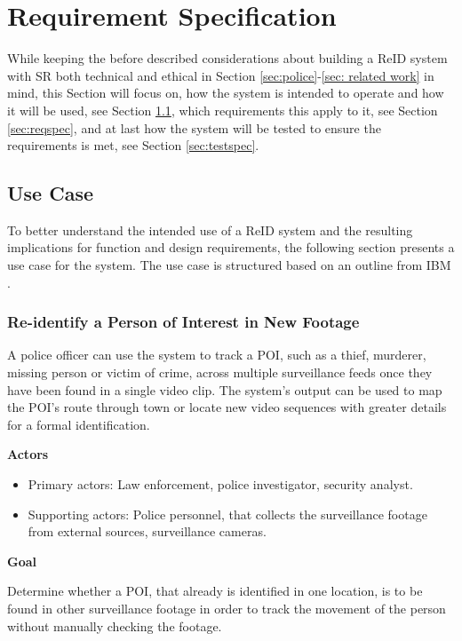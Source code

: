 \chapter{Requirement Specification} 
\label{cha:reqspec}

While keeping the before described considerations about building a \ac{ReID} system with \ac{SR} both technical and ethical in Section \ref{sec:police}-\ref{sec: related work} in mind, this Section will focus on, how the system is intended to operate and how it will be used, see Section \ref{sec:usecase}, which requirements this apply to it, see Section \ref{sec:reqspec}, and at last how the system will be tested to ensure the requirements is met, see Section \ref{sec:testspec}.

\section{Use Case}
\label{sec:usecase}
To better understand the intended use of a \acs{ReID} system and the resulting implications for function and design requirements, the following section presents a use case for the system. The use case is structured based on an outline from IBM \cite{usecase}.

\subsection{Re-identify a Person of Interest in New Footage}
A police officer can use the system to track a \acs{POI}, such as a thief, murderer, missing person or victim of crime, across multiple surveillance feeds once they have been found in a single video clip. The system's output can be used to map the \ac{POI}'s route through town or locate new video sequences with greater details for a formal identification.

\vspace{1em}

\noindent\textbf{Actors}
\begin{itemize}
    \item Primary actors: Law enforcement, police investigator, security analyst.
    \item Supporting actors: Police personnel, that collects the surveillance footage from external sources, surveillance cameras.
\end{itemize}
\vspace{1em}

\noindent\textbf{Goal}

\noindent Determine whether a \acs{POI}, that already is identified in one location, is to be found in other surveillance footage in order to track the movement of the person without manually checking the footage.

